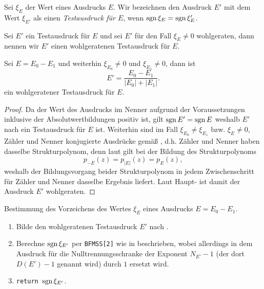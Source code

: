 \begin{definition}[Testausdruck]\label{de:Testausdruck}
Sei $\xi_E$ der Wert eines Ausdrucks $E$.
Wir bezeichnen den Ausdruck $E'$ mit dem Wert $\xi_{E'}$
als einen {\em Testausdruck für $E$},
wenn $\operatorname{sgn}\xi_E = \operatorname{sgn}\xi_E'$.
\end{definition}


\begin{definition}
Sei $E'$ ein Testausdruck für $E$
und sei $E'$ für den Fall $\xi_E\ne 0$ wohlgeraten,
dann nennen wir $E'$ einen wohlgeratenen Testausdruck für $E$.
\end{definition}


\begin{theorem}\label{th:Ein wohlgeratener Testausdruck}
Sei $E=E_0-E_1$ und weiterhin $\xi_{E_0}\ne 0$ und $\xi_{E_1}\ne 0$,
dann ist 
\begin{equation*}
  E' = \frac{E_0-E_1}{|E_0|+|E_1|}.
\end{equation*}
ein wohlgeratener Testausdruck für $E$.
\begin{proof}
Da der Wert des Ausdrucks im Nenner 
aufgrund der Voraussetzungen inklusive der Absolutwertbildungen
positiv ist, gilt $\operatorname{sgn} E'=\operatorname{sgn} E$ 
weshalb $E'$ nach 
ein Testausdruck für $E$ ist.
Weiterhin sind im Fall $\xi_{E_0}\ne\xi_{E_1}$
bzw. $\xi_E\ne 0$, Zähler und Nenner 
konjugierte Ausdrücke gemäß ,
d.h. Zähler und Nenner haben dasselbe Strukturpolynom,
denn laut 
gilt bei der Bildung des Strukturpolynoms 
\begin{equation*}
p_{-E}(z) = p_{|E|}(z) = p_E(z),
\end{equation*}
weshalb der Bildungsvorgang beider Strukturpolynom 
in jedem Zwischenschritt für Zähler und Nenner 
dasselbe Ergebnis liefert.
Laut Haupt-
ist damit der Ausdruck $E'$ wohlgeraten.
\end{proof}
\end{theorem}

\pagebreak
\begin{algorithm}[Vorzeichentest]\label{al:Vorzeichentest}
Bestimmung des Vorzeichens des Wertes $\xi_E$ 
eines Ausdrucks $E=E_0-E_1$.
\begin{enumerate}
\item Bilde den wohlgeratenen Testausdruck $E'$
      nach .
\item Berechne $\operatorname{sgn}\xi_{E'}$
      per {\tt BFMSS[2]} wie in \cite{BFMSS, PIYAP} beschrieben,
	  wobei allerdings in dem Ausdruck für die Nulltrennungsschranke
	  der Exponent $N_{E'}-1$ (der dort $D(E')-1$ genannt wird)
	  durch $1$ ersetzt wird.
\item {\tt return $\operatorname{sgn}\xi_{E'}$}.
\end{enumerate}
\end{algorithm}


